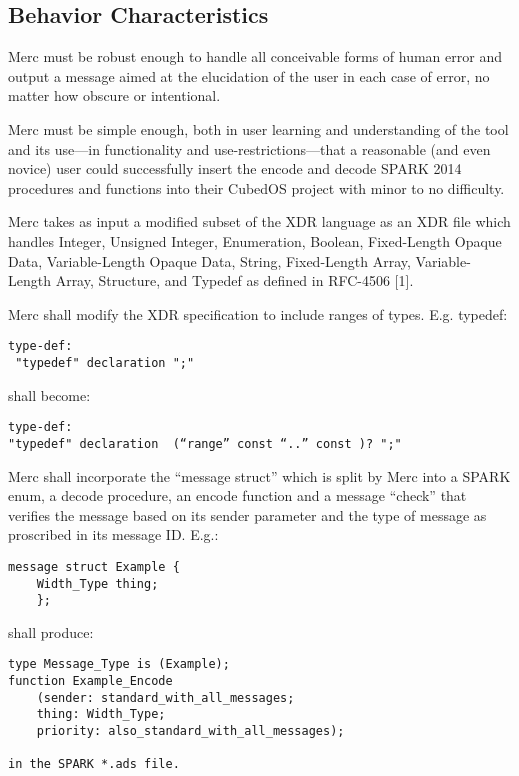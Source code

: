 \subsection{Behavior Characteristics}

Merc must be robust enough to handle all conceivable forms of human error and output a
message aimed at the elucidation of the user in each case of error, no matter how obscure or
intentional.

Merc must be simple enough, both in user learning and understanding of the tool and its
use—in functionality and use-restrictions—that a reasonable (and even novice) user could
successfully insert the encode and decode SPARK 2014 procedures and functions into their CubedOS
project with minor to no difficulty.

Merc takes as input a modified subset of the XDR language as an XDR file which handles
Integer, Unsigned Integer, Enumeration, Boolean, Fixed-Length Opaque Data, Variable-Length
Opaque Data, String, Fixed-Length Array, Variable-Length Array, Structure, and Typedef as
defined in RFC-4506 [1].

Merc shall modify the XDR specification to include ranges of types. E.g. typedef:

\begin{verbatim}
type-def:          
 "typedef" declaration ";"
\end{verbatim} 

shall become:

\begin{verbatim}
type-def:
"typedef" declaration  (“range” const “..” const )? ";"         
\end{verbatim}

Merc shall incorporate the ``message struct'' which is split by Merc into a SPARK enum, a
decode procedure, an encode function and a message “check” that verifies the message based on
its sender parameter and the type of message as proscribed in its message ID. E.g.:

\begin{verbatim}
message struct Example {
	Width_Type thing;
	};
\end{verbatim}

shall produce:

\begin{verbatim}
type Message_Type is (Example);
function Example_Encode 
	(sender: standard_with_all_messages; 
	thing: Width_Type; 
	priority: also_standard_with_all_messages);

in the SPARK *.ads file.
\end{verbatim}

